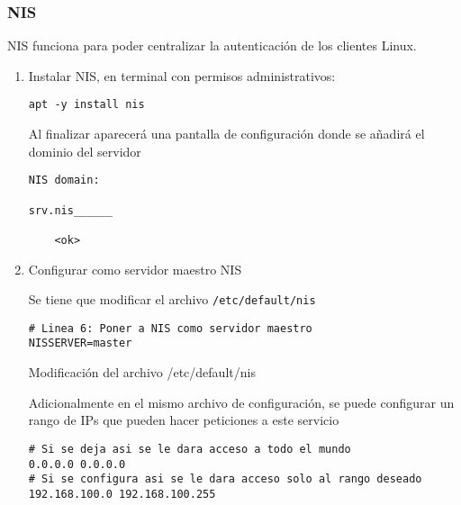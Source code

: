\documentclass[../main.tex]{subfiles}
\begin{document}
\subsubsection{NIS}\label{sec:nis}

NIS funciona para poder centralizar la autenticación de los clientes Linux.

\begin{enumerate}
\item Instalar NIS, en terminal con permisos administrativos:

  \begin{listing}[H]
  \begin{verbatim}
apt -y install nis
  \end{verbatim}
\end{listing}

  Al finalizar aparecerá una pantalla de configuración donde se
  añadirá el dominio del servidor

  \begin{listing}[H]
  \begin{verbatim}
NIS domain:

srv.nis______

    <ok>
\end{verbatim}
\end{listing}
  
\item Configurar como servidor maestro NIS

  Se tiene que modificar el archivo \texttt{/etc/default/nis}

  \begin{listing}[H]
  \begin{verbatim}
# Linea 6: Poner a NIS como servidor maestro
NISSERVER=master
\end{verbatim}
    \caption{Modificación del archivo /etc/default/nis}
    \label{listing:nis}
\end{listing}

  Adicionalmente en el mismo archivo de configuración, se puede
  configurar un rango de IPs que pueden hacer peticiones
  a este servicio

  \begin{listing}[H]
  \begin{verbatim}
# Si se deja asi se le dara acceso a todo el mundo
0.0.0.0 0.0.0.0
# Si se configura asi se le dara acceso solo al rango deseado
192.168.100.0 192.168.100.255
\end{verbatim}
\end{listing}


\end{enumerate}
\end{document}
